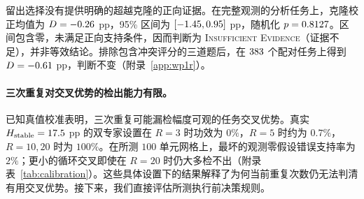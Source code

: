 留出选择没有提供明确的超越克隆的正向证据。在完整观测的分析任务上，克隆校正均值为 $D=-0.26$ pp，95\% 区间为 $[-1.45, 0.95]$ pp，随机化 $p=0.8127$。区间包含零，未满足正向支持条件，因而判断为 \textsc{Insufficient Evidence}（证据不足），并非等效结论。排除包含冲突评分的三道题后，在 $383$ 个配对任务上得到 $D=-0.61$ pp，判断不变（附录~\ref{app:wp1r}）。

\paragraph{三次重复对交叉优势的检出能力有限。}
\label{sec:power}
已知真值校准表明，三次重复可能漏检幅度可观的任务交叉优势。真实 $H_{\rm stable}=17.5$ pp 的双专家设置在 $R=3$ 时功效为 $0\%$，$R=5$ 时约为 $0.7\%$，$R=10,20$ 时为 $100\%$。在所测 $100$ 单元网格上，最坏的观测零假设错误支持率为 $2\%$；更小的循环交叉即使在 $R=20$ 时仍大多检不出（附录表~\ref{tab:calibration}）。这些具体设置下的结果解释了为何当前重复次数仍无法判清有用交叉优势。接下来，我们直接评估所测执行前决策规则。
